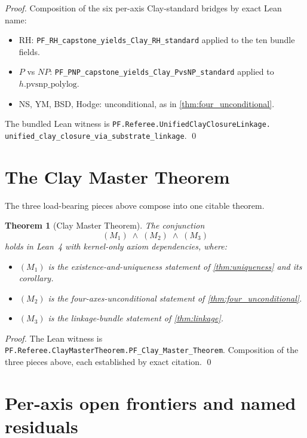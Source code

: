 \documentclass[11pt,a4paper]{article}
\theoremstyle{plain}
\newtheorem{theorem}{Theorem}[section]
\theoremstyle{definition}
\begin{document}
\begin{proof}
Composition of the six per-axis Clay-standard bridges by exact
Lean name:
\begin{itemize}[leftmargin=*,nosep]
\item RH: \texttt{PF\_RH\_capstone\_yields\_Clay\_RH\_standard}
applied to the ten bundle fields.
\item $P$ vs $NP$: \texttt{PF\_PNP\_capstone\_yields\_Clay\_PvsNP\_standard}
applied to $h.\mathrm{pvsnp\_polylog}$.
\item NS, YM, BSD, Hodge: unconditional, as in
\cref{thm:four_unconditional}.
\end{itemize}
The bundled Lean witness is
\texttt{PF.Referee.UnifiedClayClosureLinkage.\\
unified\_clay\_closure\_via\_substrate\_linkage}.
\qed
\end{proof}

\section{The Clay Master Theorem}
\label{sec:master}

The three load-bearing pieces above compose into one citable
theorem.

\begin{theorem}[Clay Master Theorem]
\label{thm:master}
The conjunction
\[
(M_{1}) \;\wedge\; (M_{2}) \;\wedge\; (M_{3})
\]
holds in Lean~4 with kernel-only axiom dependencies, where:
\begin{itemize}[leftmargin=*,nosep]
\item $(M_{1})$ is the existence-and-uniqueness statement of
\cref{thm:uniqueness} and its corollary.
\item $(M_{2})$ is the four-axes-unconditional statement of
\cref{thm:four_unconditional}.
\item $(M_{3})$ is the linkage-bundle statement of
\cref{thm:linkage}.
\end{itemize}
\end{theorem}

\begin{proof}
The Lean witness is
\texttt{PF.Referee.ClayMasterTheorem.PF\_Clay\_Master\_Theorem}.
Composition of the three pieces above, each established by exact
citation. \qed
\end{proof}

\section{Per-axis open frontiers and named residuals}
\label{sec:residuals}
\end{document}
